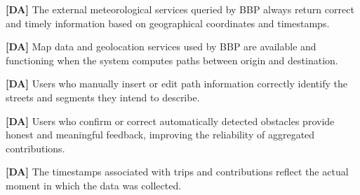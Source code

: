     \textbf{[DA\cda]} The external meteorological services queried by BBP always return correct and timely information based on geographical coordinates and timestamps.


    \textbf{[DA\cda]}  Map data and geolocation services used by BBP are available and functioning when the system computes paths between origin and destination.


    \textbf{[DA\cda]} Users who manually insert or edit path information correctly identify the streets and segments they intend to describe.


    \textbf{[DA\cda]} Users who confirm or correct automatically detected obstacles provide honest and meaningful feedback, improving the reliability of aggregated contributions.


    \textbf{[DA\cda]} The timestamps associated with trips and contributions reflect the actual moment in which the data was collected.




    


